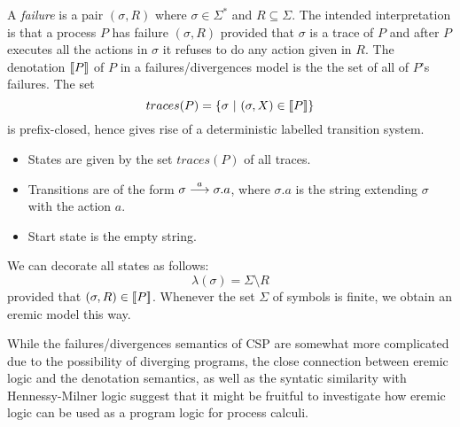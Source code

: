 A \emph{failure} is a pair $(\sigma, R)$ where $\sigma \in \Sigma^*$
and $R \subseteq \Sigma$. The intended interpretation is that a
process $P$ has failure $(\sigma, R)$ provided that $\sigma$ is a
trace of $P$ and after $P$ executes all the actions in $\sigma$ it
refuses to do any action given in $R$. The denotation $\lbrack\!\lbrack P \rbrack\!\rbrack$ of
$P$ in a failures/divergences model is the the set of all of $P$'s
failures. The set
\[
   traces(P)
      =
   \{ \sigma\ |\ (\sigma, X) \in \lbrack\!\lbrack P \rbrack\!\rbrack \}
\]
is prefix-closed, hence gives rise of a deterministic labelled
transition system.
\begin{itemize}

\item States are given by the set $traces(P)$ of all traces.

\item Transitions are of the form $\sigma \stackrel{a}{\longrightarrow} \sigma.a$, where
  $\sigma.a$ is the string extending $\sigma$ with the action $a$.

\item Start state is the empty string.

\end{itemize}
We can decorate all states as follows:
\[
   \lambda (\sigma) = \Sigma \setminus R
\]
provided that $(\sigma, R) \in \lbrack\!\lbrack P \rbrack\!\rbrack$.  Whenever the set $\Sigma$
of symbols is finite, we obtain an eremic model this way.

While the failures/divergences semantics of CSP are somewhat more
complicated due to the possibility of diverging programs, the close
connection between eremic logic and the denotation semantics, as well
as the syntatic similarity with Hennessy-Milner logic suggest that it
might be fruitful to investigate how eremic logic can be used as a
program logic for process calculi.

